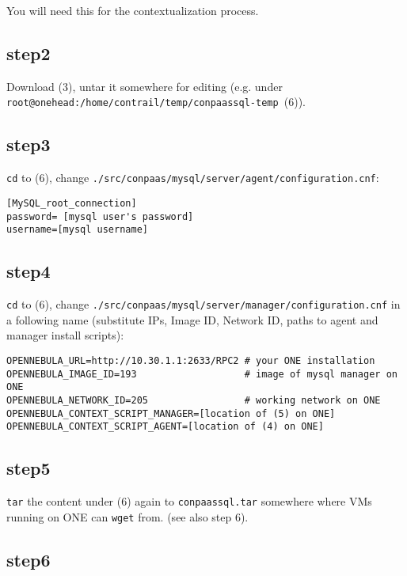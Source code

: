 \documentclass[a4paper,10pt]{article}
\begin{document}
You will need this for the contextualization process.

\subsection*{step2} 

Download (3), untar it somewhere for editing (e.g. under \\ {\tt root@onehead:/home/contrail/temp/conpaassql-temp }(6)).

\subsection*{step3}

{\tt cd} to (6), change {\tt ./src/conpaas/mysql/server/agent/configuration.cnf}:

\begin{verbatim}
[MySQL_root_connection]
password= [mysql user's password]
username=[mysql username]
\end{verbatim}

\subsection*{step4}

{\tt cd} to (6), change {\tt ./src/conpaas/mysql/server/manager/configuration.cnf} in a following name (substitute IPs, Image ID, Network ID, paths to agent and manager install scripts):

\begin{verbatim}
OPENNEBULA_URL=http://10.30.1.1:2633/RPC2 # your ONE installation
OPENNEBULA_IMAGE_ID=193					  # image of mysql manager on ONE
OPENNEBULA_NETWORK_ID=205                 # working network on ONE
OPENNEBULA_CONTEXT_SCRIPT_MANAGER=[location of (5) on ONE]
OPENNEBULA_CONTEXT_SCRIPT_AGENT=[location of (4) on ONE]
\end{verbatim}

\subsection*{step5}

{\tt tar} the content under (6) again to {\tt conpaassql.tar} somewhere where VMs running on ONE can {\tt wget} from. (see also step 6). 

\subsection*{step6}
\end{document}
